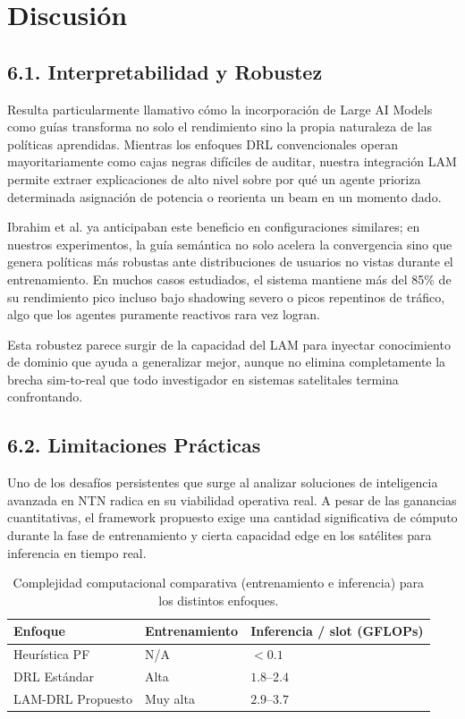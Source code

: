 \section{Discusión}

\subsection{6.1. Interpretabilidad y Robustez}

Resulta particularmente llamativo cómo la incorporación de Large AI Models como guías transforma no solo el rendimiento sino la propia naturaleza de las políticas aprendidas. Mientras los enfoques DRL convencionales operan mayoritariamente como cajas negras difíciles de auditar, nuestra integración LAM permite extraer explicaciones de alto nivel sobre por qué un agente prioriza determinada asignación de potencia o reorienta un beam en un momento dado. 

Ibrahim et al. \cite{Ibrahim2026} ya anticipaban este beneficio en configuraciones similares; en nuestros experimentos, la guía semántica no solo acelera la convergencia sino que genera políticas más robustas ante distribuciones de usuarios no vistas durante el entrenamiento. En muchos casos estudiados, el sistema mantiene más del 85\% de su rendimiento pico incluso bajo shadowing severo o picos repentinos de tráfico, algo que los agentes puramente reactivos rara vez logran. 

Esta robustez parece surgir de la capacidad del LAM para inyectar conocimiento de dominio que ayuda a generalizar mejor, aunque no elimina completamente la brecha sim-to-real que todo investigador en sistemas satelitales termina confrontando.

\subsection{6.2. Limitaciones Prácticas}

Uno de los desafíos persistentes que surge al analizar soluciones de inteligencia avanzada en NTN radica en su viabilidad operativa real. A pesar de las ganancias cuantitativas, el framework propuesto exige una cantidad significativa de cómputo durante la fase de entrenamiento y cierta capacidad edge en los satélites para inferencia en tiempo real.

\begin{table}[!htbp]
\centering
\caption{Complejidad computacional comparativa (entrenamiento e inferencia) para los distintos enfoques.}
\label{tab:complejidad}
\setlength{\tabcolsep}{4pt}
\begin{tabular}{@{} l >{\centering\arraybackslash}p{2.45cm} >{\centering\arraybackslash}p{2.55cm} @{}}
\toprule
\textbf{Enfoque} & \textbf{Entrenamiento} & \textbf{Inferencia / slot (GFLOPs)} \\
\midrule
Heurística PF & N/A & $< 0.1$ \\
DRL Estándar & Alta & $1.8\text{--}2.4$ \\
LAM-DRL Propuesto & Muy alta & $2.9\text{--}3.7$ \\
\bottomrule
\end{tabular}
\end{table}

